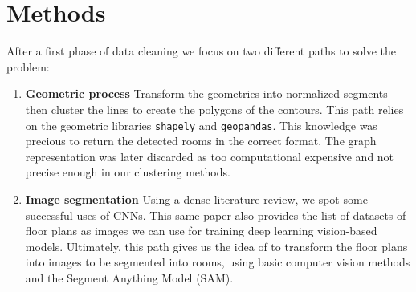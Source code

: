 \documentclass[11pt]{article}
\begin{document}
\section{Methods}
\label{sec:methods}

After a first phase of data cleaning we focus on two different paths to solve the problem:

\begin{enumerate}
    \item \textbf{Geometric process} Transform the geometries into normalized segments 
    \cite{Schafer2011AutomaticGO} then cluster the lines to 
    create the polygons\cite{dominguez2012Semiautomaticdetection} of the contours. This path relies on the
    geometric libraries \texttt{shapely} and \texttt{geopandas}. This knowledge
    was precious to return the detected rooms in the correct format. The graph representation 
    was later discarded as too computational expensive and not precise enough in our clustering methods.
    \item \textbf{Image segmentation} Using a dense literature review\cite{PIZARRO2022104348}, we 
    spot some successful uses of CNNs\cite{ijgi10020097}. This same paper also provides the list
    of datasets of floor plans as images we can use for training deep learning vision-based models.
    Ultimately, this path gives us the idea of to transform the floor plans into
    images to be segmented into rooms, using basic computer vision methods and the Segment 
    Anything Model (SAM)\cite{kirillov2023segment}.
\end{enumerate}
\end{document}
